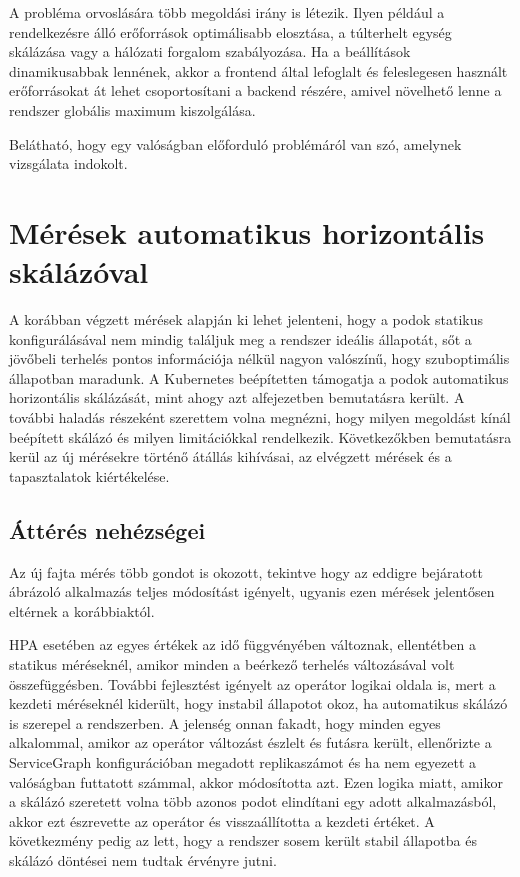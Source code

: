 A probléma orvoslására több megoldási irány is létezik. 
Ilyen például a rendelkezésre álló erőforrások optimálisabb elosztása, a túlterhelt egység skálázása vagy a hálózati forgalom szabályozása.
Ha a beállítások dinamikusabbak lennének, akkor a frontend által lefoglalt és feleslegesen használt erőforrásokat át lehet csoportosítani a backend részére, amivel növelhető lenne a rendszer globális maximum kiszolgálása.

Belátható, hogy egy valóságban előforduló problémáról van szó, amelynek vizsgálata indokolt.

\section{Mérések automatikus horizontális skálázóval}

A korábban végzett mérések alapján ki lehet jelenteni, hogy a podok statikus konfigurálásával nem mindig találjuk meg a rendszer ideális állapotát,  sőt a jövőbeli terhelés pontos információja nélkül nagyon valószínű, hogy szuboptimális állapotban maradunk.
A Kubernetes beépítetten támogatja a podok automatikus horizontális skálázását, mint ahogy azt  alfejezetben bemutatásra került.
A további haladás részeként szerettem volna megnézni, hogy milyen megoldást kínál beépített skálázó és milyen limitációkkal rendelkezik.
Következőkben bemutatásra kerül az új mérésekre történő átállás kihívásai, az elvégzett mérések és a tapasztalatok kiértékelése.

\subsection{Áttérés nehézségei}
Az új fajta mérés több gondot is okozott, tekintve hogy az eddigre bejáratott ábrázoló alkalmazás teljes módosítást igényelt, ugyanis ezen mérések jelentősen eltérnek a korábbiaktól.

HPA esetében az egyes értékek az idő függvényében változnak, ellentétben a statikus méréseknél, amikor minden a beérkező terhelés változásával volt összefüggésben.
További fejlesztést igényelt az operátor logikai oldala is, mert a kezdeti méréseknél kiderült, hogy instabil állapotot okoz, ha automatikus skálázó is szerepel a rendszerben. 
A jelenség onnan fakadt, hogy minden egyes alkalommal, amikor az operátor változást észlelt és futásra került, ellenőrizte a ServiceGraph konfigurációban megadott replikaszámot és ha nem egyezett a valóságban futtatott számmal, akkor módosította azt.
Ezen logika miatt, amikor a skálázó szeretett volna több azonos podot elindítani egy adott alkalmazásból, akkor ezt észrevette az operátor és visszaállította a kezdeti értéket.
A következmény pedig az lett, hogy a rendszer sosem került stabil állapotba és skálázó döntései nem tudtak érvényre jutni.

